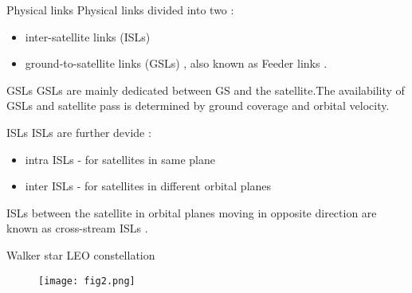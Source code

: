 \documentclass{beamer}
\begin{document}
\begin{frame}
\begin{block}{Physical links}
    Physical links divided into two :
    \begin{itemize}
        \item inter-satellite links (ISLs)
        \item ground-to-satellite links (GSLs) , also known as Feeder links . 
    \end{itemize}
\end{block}
\begin{block}{GSLs}
GSLs are mainly dedicated between GS and the satellite.The availability of GSLs and satellite pass is determined by ground coverage and  orbital velocity.
\end{block}
\begin{block}{ISLs}
ISLs are further devide :
\begin{itemize}
    \item intra ISLs - for satellites in same plane 
    \item inter ISLs - for satellites in different orbital planes
\end{itemize}
ISLs between the satellite in orbital planes moving in opposite direction are known as cross-stream ISLs . 
\end{block}
\end{frame}

\begin{frame}{Walker star LEO constellation}
\begin{figure}
    \centering
    \texttt{[image: fig2.png]}
\end{figure}
\end{frame}
\end{document}
